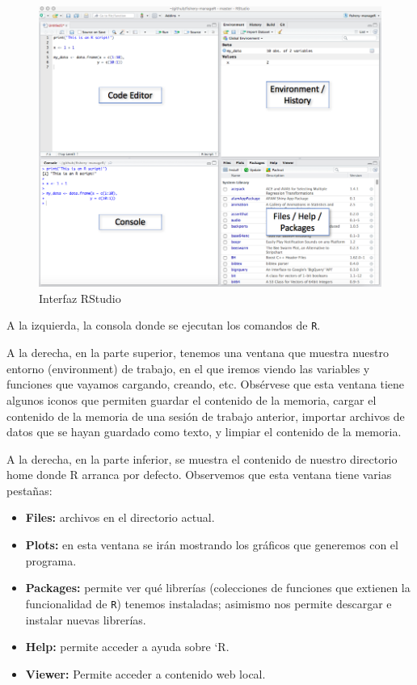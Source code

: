 \documentclass[]{book}
\providecommand{\tightlist}{%
  \setlength{\itemsep}{0pt}\setlength{\parskip}{0pt}}
\begin{document}
\begin{figure}

{\centering \includegraphics[width=1\linewidth]{figures/rstudio_ide} 

}

\caption{Interfaz RStudio}\label{fig:rstudio}
\end{figure}

A la izquierda, la consola donde se ejecutan los comandos de \texttt{R}.

A la derecha, en la parte superior, tenemos una ventana que muestra
nuestro entorno (environment) de trabajo, en el que iremos viendo las
variables y funciones que vayamos cargando, creando, etc. Obsérvese que
esta ventana tiene algunos iconos que permiten guardar el contenido de
la memoria, cargar el contenido de la memoria de una sesión de trabajo
anterior, importar archivos de datos que se hayan guardado como texto, y
limpiar el contenido de la memoria.

A la derecha, en la parte inferior, se muestra el contenido de nuestro
directorio home donde R arranca por defecto. Observemos que esta ventana
tiene varias pestañas:

\begin{itemize}
\tightlist
\item
  \textbf{Files:} archivos en el directorio actual.
\item
  \textbf{Plots:} en esta ventana se irán mostrando los gráficos que
  generemos con el programa.
\item
  \textbf{Packages:} permite ver qué librerías (colecciones de funciones
  que extienen la funcionalidad de \texttt{R}) tenemos instaladas;
  asimismo nos permite descargar e instalar nuevas librerías.
\item
  \textbf{Help:} permite acceder a ayuda sobre `R.
\item
  \textbf{Viewer:} Permite acceder a contenido web local.
\end{itemize}
\end{document}
